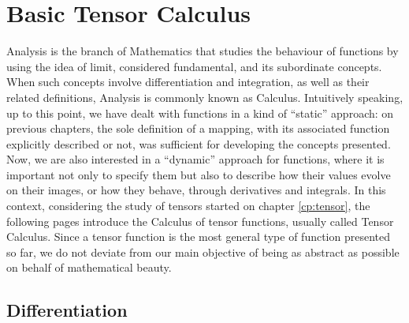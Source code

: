 
\chapter{Basic Tensor Calculus}

Analysis is the branch of Mathematics that studies the behaviour of functions by using the idea of limit, considered fundamental, and its subordinate concepts. When such concepts involve  differentiation and integration, as well as their related definitions, Analysis is commonly known as Calculus. Intuitively speaking, up to this point, we have dealt with functions in a kind of ``static'' approach: on previous chapters, the sole definition of a mapping, with its associated function explicitly described or not, was sufficient for developing the concepts presented. Now, we are also interested in a ``dynamic'' approach for functions, where it is important not only to specify them but also to describe how their values evolve on their images, or how they behave, through derivatives and integrals. In this context, considering the study of tensors started on chapter \ref{cp:tensor}, the following pages introduce the Calculus of tensor functions, usually called Tensor Calculus. Since a tensor function is the most general type of function presented so far, we do not deviate from our main objective of being as abstract as possible on behalf of mathematical beauty.



\section{Differentiation}\label{sec:diffe}

